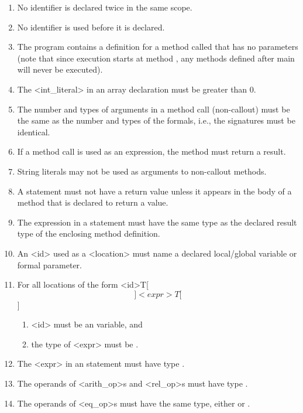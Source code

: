 \begin{enumerate}
\item No identifier is declared twice in the same scope.
\item No identifier is used before it is declared.
\item The program contains a definition for a method called 
       that has no parameters (note that since execution starts at
       method , any methods defined after main will never be 
      executed).
\item The {\bnf <int_literal>} in an array declaration must be greater
      than 0.
\item The number and types of arguments in a method call (non-callout) must be the same
      as the number and types of the formals, i.e., the signatures
must be identical.
\item If a method call is used as an expression, the method must
      return a result.
\item String literals may not be used as arguments to non-callout methods.
\item A  statement must not have a return value unless it appears
      in the body of a method that is declared to return a value.
\item The expression in a  statement must have the same type as
      the declared result type of  the enclosing method definition.
\item An {\bnf <id>} used as a {\bnf <location>} must name a declared 
      local/global variable or formal parameter.
\item For all locations of the form {\bnf <id>T[\[]<expr>T[\]]}
      \begin{enumerate}
      \item {\bnf <id>} must be an 
             variable, and 
      \item the type of {\bnf <expr>} must be .
      \end{enumerate}
\item The {\bnf <expr>} in an  statement must have type
      .
\item The operands of {\bnf <arith_op>}s and {\bnf <rel_op>}s must have type
      .
\item The operands of {\bnf <eq_op>}s must have the same type, either
       or .

\end{enumerate}
